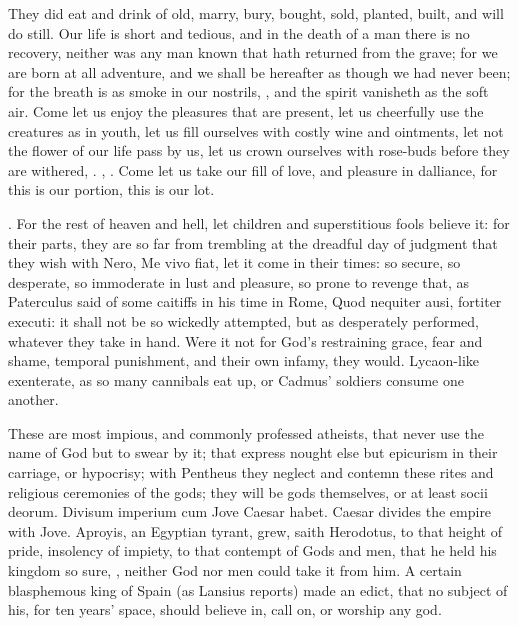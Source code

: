{They did eat and drink of old, marry, bury, bought, sold,
planted, built, and will do still. Our life is short and tedious,
and in the death of a man there is no recovery, neither was any man
known that hath returned from the grave; for we are born at all
adventure, and we shall be hereafter as though we had never been; for
the breath is as smoke in our nostrils, \etc{}, and the spirit vanisheth
as the soft air. Come let us enjoy the pleasures that are
present, let us cheerfully use the creatures as in youth, let us fill
ourselves with costly wine and ointments, let not the flower of our
life pass by us, let us crown ourselves with rose-buds before they are
withered, \etc{}. , \etc{}.  Come let
us take our fill of love, and pleasure in dalliance, for this is our
portion, this is our lot.

. For the rest of
heaven and hell, let children and superstitious fools believe it: for
their parts, they are so far from trembling at the dreadful day of
judgment that they wish with Nero, Me vivo fiat, let it come in their
times: so secure, so desperate, so immoderate in lust and pleasure, so
prone to revenge that, as Paterculus said of some caitiffs in his time
in Rome, Quod nequiter ausi, fortiter executi: it shall not be so
wickedly attempted, but as desperately performed, whatever they take in
hand. Were it not for God's restraining grace, fear and shame, temporal
punishment, and their own infamy, they would. Lycaon-like exenterate,
as so many cannibals eat up, or Cadmus' soldiers consume one another.

These are most impious, and commonly professed atheists, that never use
the name of God but to swear by it; that express nought else but
epicurism in their carriage, or hypocrisy; with Pentheus they neglect
and contemn these rites and religious ceremonies of the gods; they will
be gods themselves, or at least socii deorum. Divisum imperium cum Jove
Caesar habet. Caesar divides the empire with Jove. Aproyis, an Egyptian
tyrant, grew, saith Herodotus, to that height of pride, insolency
of impiety, to that contempt of Gods and men, that he held his kingdom
so sure, , neither God
nor men could take it from him. A certain blasphemous king of
Spain (as Lansius reports) made an edict, that no subject of his,
for ten years' space, should believe in, call on, or worship any god.

}
